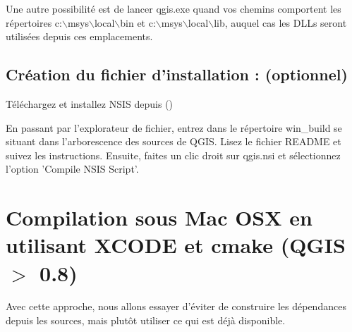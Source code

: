 Une autre possibilité est de lancer qgis.exe quand vos chemins comportent les répertoires c:$\backslash$msys$\backslash$local$\backslash$bin et c:$\backslash$msys$\backslash$local$\backslash$lib, auquel cas les DLLs seront utilisées depuis ces emplacements.

% 

\subsection{Création du fichier d'installation : (optionnel)}
Téléchargez et installez NSIS depuis ()

En passant par l'explorateur de fichier, entrez dans le répertoire win\_build se situant dans l'arborescence des sources de QGIS. Lisez le fichier README  et suivez les instructions. Ensuite, faites un clic droit sur qgis.nsi et sélectionnez l'option 'Compile NSIS Script'. 

% 

\section{Compilation sous Mac OSX en utilisant XCODE et cmake (QGIS $>$
0.8)}\label{sec:install_macosx}

Avec cette approche, nous allons essayer d'éviter de construire les dépendances depuis les sources, mais plutôt utiliser ce qui est déjà disponible.


